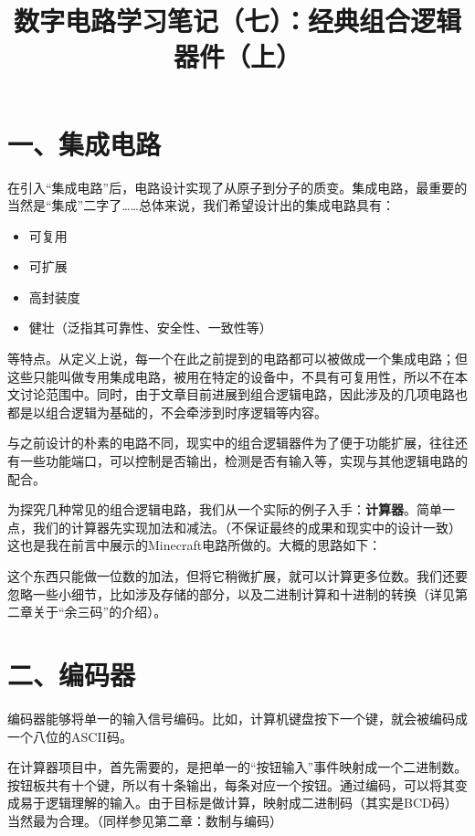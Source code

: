 \documentclass[UTF8]{ctexart}
\title{数字电路学习笔记（七）：经典组合逻辑器件（上）}
\begin{document}
\maketitle

\section*{一、集成电路}

在引入“集成电路”后，电路设计实现了从原子到分子的质变。集成电路，最重要的当然是“集成”二字了……总体来说，我们希望设计出的集成电路具有：

\begin{itemize}
\item 可复用
\item 可扩展
\item 高封装度
\item 健壮（泛指其可靠性、安全性、一致性等）
\end{itemize}

等特点。从定义上说，每一个在此之前提到的电路都可以被做成一个集成电路；但这些只能叫做专用集成电路，被用在特定的设备中，不具有可复用性，所以不在本文讨论范围中。同时，由于文章目前进展到组合逻辑电路，因此涉及的几项电路也都是以组合逻辑为基础的，不会牵涉到时序逻辑等内容。

与之前设计的朴素的电路不同，现实中的组合逻辑器件为了便于功能扩展，往往还有一些功能端口，可以控制是否输出，检测是否有输入等，实现与其他逻辑电路的配合。

为探究几种常见的组合逻辑电路，我们从一个实际的例子入手：\textbf{计算器}。简单一点，我们的计算器先实现加法和减法。（不保证最终的成果和现实中的设计一致）这也是我在前言中展示的Minecraft电路所做的。大概的思路如下：


这个东西只能做一位数的加法，但将它稍微扩展，就可以计算更多位数。我们还要忽略一些小细节，比如涉及存储的部分，以及二进制计算和十进制的转换（详见第二章关于“余三码”的介绍）。

\section*{二、编码器}

编码器能够将单一的输入信号编码。比如，计算机键盘按下一个键，就会被编码成一个八位的ASCII码。

在计算器项目中，首先需要的，是把单一的“按钮输入”事件映射成一个二进制数。按钮板共有十个键，所以有十条输出，每条对应一个按钮。通过编码，可以将其变成易于逻辑理解的输入。由于目标是做计算，映射成二进制码（其实是BCD码）当然最为合理。（同样参见第二章：数制与编码）
\end{document}
